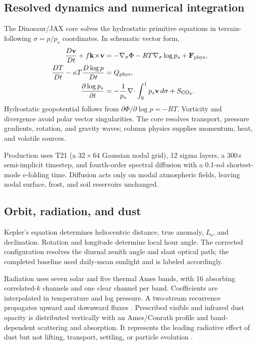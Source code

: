 \documentclass{article}
\newcommand{\Ls}{L_\mathrm{s}}
\begin{document}
\subsection{Resolved dynamics and numerical integration}
The Dinosaur/JAX core \citep{dinosaur2024,jax2018} solves the hydrostatic
primitive equations in terrain-following \(\sigma=p/p_s\) coordinates. In
schematic vector form,
\begin{align}
\frac{D\mathbf v}{Dt}+f\mathbf k\!\times\!\mathbf v
 &= -\nabla_\sigma\Phi-RT\nabla_\sigma\log p_s+\mathbf F_{\rm phys},\\
\frac{DT}{Dt}-\kappa T\frac{D\log p}{Dt}&=Q_{\rm phys},\\
\frac{\partial\log p_s}{\partial t}
 &= -\frac{1}{p_s}\nabla\!\cdot\int_0^1p_s\mathbf v\,d\sigma+S_{\rm CO_2}.
\end{align}
Hydrostatic geopotential follows from \(\partial\Phi/\partial\log p=-RT\).
Vorticity and divergence avoid polar vector singularities. The core resolves
transport, pressure gradients, rotation, and gravity waves; column physics
supplies momentum, heat, and volatile sources.

Production uses T21 (a \(32\times64\) Gaussian nodal grid), 12 sigma layers, a
300\,s semi-implicit timestep, and fourth-order spectral diffusion with a
0.1-sol shortest-mode e-folding time. Diffusion acts only on modal atmospheric
fields, leaving nodal surface, frost, and soil reservoirs unchanged.

\subsection{Orbit, radiation, and dust}
Kepler's equation determines heliocentric distance, true anomaly, \(\Ls\), and
declination. Rotation and longitude determine local hour angle. The corrected
configuration resolves the diurnal zenith angle and slant optical path; the
completed baseline used daily-mean sunlight and is labeled accordingly.

Radiation uses seven solar and five thermal Ames bands, with 16 absorbing
correlated-\(k\) channels and one clear channel per band. Coefficients are
interpolated in temperature and log pressure. A two-stream recurrence propagates
upward and downward fluxes \citep{toon1989twostream}. Prescribed visible and
infrared dust opacity is distributed vertically with an Ames/Conrath profile and
band-dependent scattering and absorption. It represents the leading radiative
effect of dust but not lifting, transport, settling, or particle evolution
\citep{madeleine2011dust}.
\end{document}
